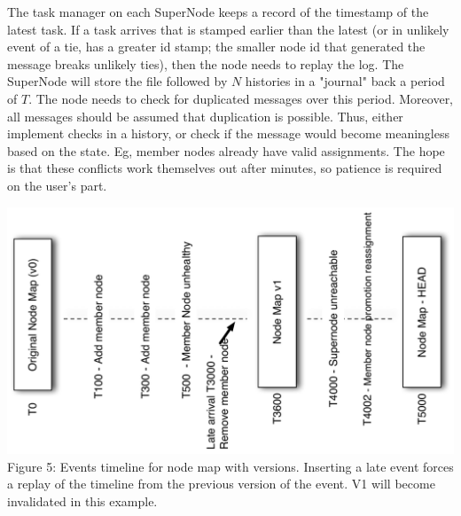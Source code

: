 \documentclass[oneside,12pt]{memoir}
\begin{document}
  The task manager on each SuperNode keeps a record of the timestamp of the latest task.  If a task arrives that is stamped earlier than the latest (or in unlikely event of a tie, has a greater id stamp; the smaller node id that generated the message breaks unlikely ties), then the node needs to replay the log. 
  The SuperNode will store the file followed by $N$ histories in a "journal" back a period of $T$.  
    The node needs to check for duplicated messages over this period.  Moreover, all messages should be assumed that duplication is possible.  Thus, either implement checks in a history, or check if the message would become meaningless based on the state.  Eg, member nodes already have valid assignments.   The hope is that these conflicts work themselves out after minutes, so patience is required on the user's part. \\
\begin{center}
\includegraphics[width=\textwidth]{presentation/timeline.pdf}
Figure 5: Events timeline for node map with versions.  Inserting a late event forces a replay of the timeline from the previous version of the event.  V1 will become invalidated in this example. 
\end{center}
\end{document}
